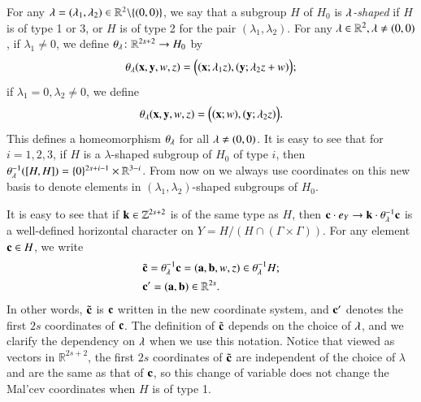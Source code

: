 \documentclass[12pt,amstex]{amsart}
\theoremstyle{definition}
\def \c {\bold{c}}
\def \a {\bold{a}}
\def \b {\bold{b}}
\def \k {\bold{k}}
\def \l {\bold{\lambda}}
\begin{document}
For any $\l=(\lambda_{1},\lambda_{2})\in\mathbb{R}^{2}\backslash \{(0,0)\}$, we say that a subgroup $H$ of $H_{0}$ is \emph{$\l$-shaped} if $H$ is of type 1 or 3, or $H$ is of type 2 for the pair $(\lambda_{1},\lambda_{2})$.
 For any $\l\in\mathbb{R}^{2},\l\neq (0,0)$, if $\lambda_{1}\neq 0$, we define $\theta_{\l}\colon \mathbb{R}^{2s+2}\rightarrow H_{0}$ by
   \begin{equation}\nonumber
    \begin{split}
\theta_{\l}(\bold{x},\bold{y},w,z)=\Bigl((\bold{x};\lambda_{1}z),(\bold{y};\lambda_{2}z+w)\Bigr);
    \end{split}
  \end{equation}
  if $\lambda_{1}=0, \lambda_{2}\neq 0$, we define
     \begin{equation}\nonumber
    \begin{split}
\theta_{\l}(\bold{x},\bold{y},w,z)=\Bigl((\bold{x};w),(\bold{y};\lambda_{2}z)\Bigr).
    \end{split}
  \end{equation}
  This defines a homeomorphism $\theta_{\l}$ for all $\l\neq (0,0)$.
  It is easy to see that for $i=1,2,3$, if $H$ is a $\lambda$-shaped subgroup of $H_{0}$ of type $i$,
then $\theta_{\l}^{-1}([H,H])=\{0\}^{2s+i-1}\times\mathbb{R}^{3-i}$. From now on we always use coordinates on this new basis to denote elements
in $(\lambda_{1},\lambda_{2})$-shaped subgroups of $H_{0}$.

It is easy to see that if $\k\in\mathbb{Z}^{2s+2}$ is of the same type as $H$, then
$\c \cdot e_{Y}\rightarrow \k\cdot\theta_{\l}^{-1}\c$
is a well-defined horizontal character on $Y=H/(H\cap(\Gamma\times\Gamma))$.
For any element $\c\in H$, we write
     \begin{equation}\nonumber
    \begin{split}
     &\tilde{\c}=\theta_{\l}^{-1}\c=(\a,\b,w,z)\in \theta_{\l}^{-1}H;
     \\&\c'=(\a,\b)\in\mathbb{R}^{2s}.
    \end{split}
  \end{equation}
In other words, $\tilde{\c}$ is $\c$ written in the new coordinate system, and $\c'$ denotes the first $2s$ coordinates of $\c$.
  The definition of $\tilde{\c}$ depends on the choice of $\l$, and we clarify the dependency on $\l$ when we use this notation.
Notice that viewed as vectors in $\mathbb{R}^{2s+2}$, the first $2s$ coordinates of $\tilde{\c}$ are independent of the choice of $\lambda$ and are the same as that of $\c$, so this change of
variable does not change the Mal'cev coordinates when $H$ is of type 1.
\end{document}
